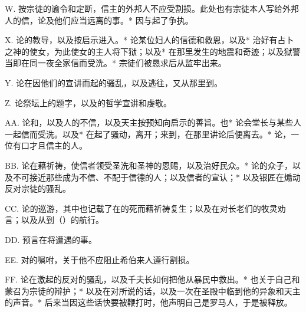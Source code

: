 W. 按宗徒的谕令和定断，信主的外邦人不应受割损。此处也有宗徒本人写给外邦人的信，论及他们应当远离的事。* 因与起了争执。\par

X. 论的教导，以及按启示进入。* 论某位妇人的信德和救恩，以及* 治好有占卜之神的使女，为此使女的主人将下狱；以及* 在那里发生的地震和奇迹；以及狱警当即在同一夜全家信而受洗。* 宗徒们被恳求后从监牢出来。\par

Y. 论在因他们的宣讲而起的骚乱，以及逃往，又从那里到。\par

Z. 论祭坛上的题字，以及的哲学宣讲和虔敬。\par

AA. 论和，以及人的不信，以及天主按预知向启示的善旨。也* 论会堂长与某些人一起信而受洗。以及* 在起了骚动，离开；来到，在那里讲论后便离去。* 论，一位有口才且信主的人。\par

BB. 论在藉祈祷，使信者领受圣洗和圣神的恩赐，以及治好民众。* 论的众子，以及不可接近那些成为不信、不配于信德的人；以及信者的宣认；* 以及银匠在煽动反对宗徒的骚乱。\par

CC. 论的巡游，其中也记载了在的死而藉祈祷复生；以及在对长老们的牧灵劝言；以及从到（）的航行。\par

DD. 预言在将遭遇的事。\par

EE. 对的嘱咐，关于他不应阻止希伯来人遵行割损。\par

FF. 论在激起的反对的骚乱，以及千夫长如何把他从暴民中救出。* 也关于自己和蒙召为宗徒的辩护；* 以及在对所说的话，以及一次在圣殿中临到他的异象和天主的声音。* 后来当因这些话快要被鞭打时，他声明自己是罗马人，于是被释放。\par

